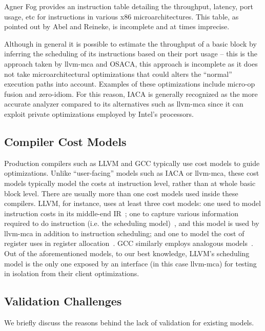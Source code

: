 Agner Fog\cite{agner} provides an instruction table detailing the throughput,
latency, port usage, etc for instructions in various x86 microarchitectures.
This table, as pointed out by Abel and Reineke\cite{uops}, is incomplete and at times 
imprecise. 

Although in general it is possible to estimate the throughput of 
a basic block by inferring the scheduling of its instructions based on their
port usage -- this is the approach taken by llvm-mca and OSACA\cite{osaca},
this approach is incomplete as it does not take microarchitectural
optimizations that could alters the ``normal'' execution paths into account. 
Examples of these optimizations include micro-op fusion and zero-idiom.
For this reason, IACA\cite{iaca} is generally recognized as the more accurate analyzer
compared to its alternatives such as llvm-mca since it can exploit
private optimizations employed by Intel's processors.

\subsection{Compiler Cost Models}
Production compilers such as LLVM\cite{llvm} and GCC typically use cost models 
to guide optimizations.
Unlike ``user-facing'' models such as IACA or llvm-mca, these cost models typically
model the costs at instruction level, rather than at whole basic block level.
There are usually more than one cost models used inside these compilers.
LLVM, for instance, uses at least three cost models: 
one used to model instruction costs in its middle-end IR~\cite{llvm-cost};
one to capture various information required to do instruction 
(i.e. the scheduling model)~\cite{llvm-sched}, and this model is used by llvm-mca in addition
to instruction scheduling;
and one to model the cost of register uses in register allocation~\cite{llvm-reg}.
GCC similarly employs analogous models~\cite{gcc-cost,gcc-sched}.
Out of the aforementioned models, to our best knowledge, 
LLVM's scheduling model is the only one exposed by an interface
(in this case llvm-mca) for testing in isolation from their client optimizations.

\subsection{Validation Challenges}
We briefly discuss the reasons behind the lack of validation for existing models.

